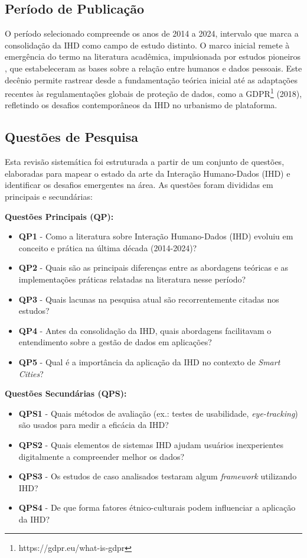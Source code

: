\documentclass[12pt]{article}
\begin{document}
\subsection{Período de Publicação}

    O período selecionado compreende os anos de 2014 a 2024, intervalo que marca a consolidação da IHD como campo de estudo distinto. O marco inicial remete à emergência do termo na literatura acadêmica, impulsionada por estudos pioneiros \cite{mortier2015humandatainteractionhumanface}, que estabeleceram as bases sobre a relação entre humanos e dados pessoais. Este decênio permite rastrear desde a fundamentação teórica inicial até as adaptações recentes às regulamentações globais de proteção de dados, como a GDPR\footnote{https://gdpr.eu/what-is-gdpr} (2018), refletindo os desafios contemporâneos da IHD no urbanismo de plataforma.

\subsection{Questões de Pesquisa}

 Esta revisão sistemática foi estruturada a partir de um conjunto de questões, elaboradas para mapear o estado da arte da Interação Humano-Dados (IHD) e identificar os desafios emergentes na área. As questões foram divididas em principais e secundárias:

\textbf{Questões Principais (QP):}
\begin{itemize}
\item \textbf{QP1} - Como a literatura sobre Interação Humano-Dados (IHD) evoluiu em conceito e prática na última década (2014-2024)?
\item \textbf{QP2} - Quais são as principais diferenças entre as abordagens teóricas e as implementações práticas relatadas na literatura nesse período?
\item \textbf{QP3} - Quais lacunas na pesquisa atual são recorrentemente citadas nos estudos?
\item \textbf{QP4} - Antes da consolidação da IHD, quais abordagens facilitavam o entendimento sobre a gestão de dados em aplicações?
\item \textbf{QP5} - Qual é a importância da aplicação da IHD no contexto de \textit{Smart Cities}?
\end{itemize}

\textbf{Questões Secundárias (QPS):}
\begin{itemize}
\item \textbf{QPS1} - Quais métodos de avaliação (ex.: testes de usabilidade, \textit{eye-tracking}) são usados para medir a eficácia da IHD?
\item \textbf{QPS2} - Quais elementos de sistemas IHD ajudam usuários inexperientes digitalmente a compreender melhor os dados?
\item \textbf{QPS3} - Os estudos de caso analisados testaram algum \textit{framework} utilizando IHD?
\item \textbf{QPS4} - De que forma fatores étnico-culturais podem influenciar a aplicação da IHD?
\end{itemize}
\end{document}
